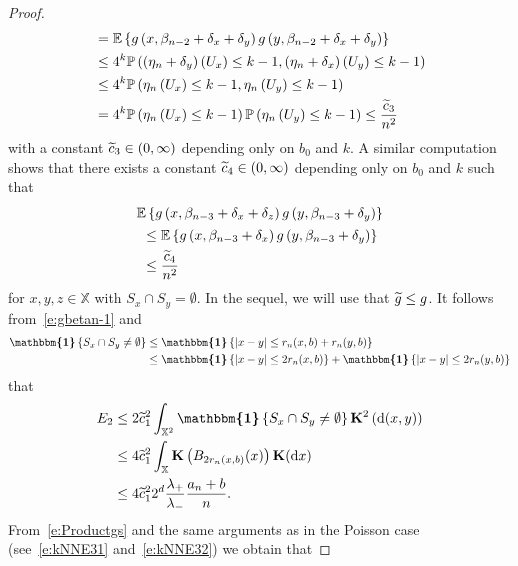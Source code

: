 \documentclass[AHL,Unicode,longabstracts]{cedram}
\newcommand*\bK{\mathbf{K}}
\renewcommand*\P{\mathbb{P}}
\newcommand*\X{\mathbb{X}}
\newcommand{\E}{\mathbb{E}}
\newcommand*\md{\mathrm{d}}
\newcommand{\mean}[1] {\E\left\{{#1}\right\}}
\newcommand{\ind}{\boldsymbol{\mathbbm{1}}}
\newcommand{\prob}[1]{\P\left(#1\right)}
\let\oldtilde\tilde
\renewcommand*{\tilde}[1]{\mathchoice{\widetilde{#1}}{\widetilde{#1}}{\oldtilde{#1}}{\oldtilde{#1}}}
\begin{document}
\begin{proof}
\begin{multline}
\begin{aligned}
&= \mean{g\left(x,\beta_{n-2}+\delta_x+\delta_y\right) g\left(y,\beta_{n-2}+\delta_x+\delta_y\right)} \\
& \leq 4^k \prob{\left(\eta_{n}+\delta_y\right)\left(U_{x}\right)\leq k-1, \left(\eta_{n}+\delta_x\right)\left(U_{y}\right)\leq k-1}\\
&\leq 4^k \prob{\eta_{n}\left(U_{x}\right)\leq k-1, \eta_{n}\left(U_{y}\right)\leq k-1} \\
& = 4^k \prob{\eta_{n}\left(U_{x}\right)\leq k-1} \prob{\eta_{n}\left(U_{y}\right)\leq k-1} \leq \frac{\tilde{c}_3}{n^2}
\end{aligned}
\end{multline}
with a constant $\tilde{c}_3\in(0,\infty)$ depending only on $b_0$ and $k$. A similar computation shows that there exists a constant $\tilde{c}_4\in(0,\infty)$ depending only on $b_0$ and $k$ such that
\begin{multline}\label{eqn:gSquareDisjointn-3}
\mean{g\left(x,\beta_{n-3}+\delta_x+\delta_z\right) g\left(y,\beta_{n-3}+\delta_y\right)}\\
\begin{aligned}
&\leq \mean{g\left(x,\beta_{n-3}+\delta_x\right) g\left(y,\beta_{n-3}+\delta_y\right)}
\\
&\leq \frac{\tilde{c}_4}{n^2}
\end{aligned}
\end{multline}
for $x,y,z\in \X$ with $S_x\cap S_y = \emptyset$. In the sequel, we will use that $\tilde{g}\leq g$. It follows from~\eqref{e:gbetan-1} and
\begin{align*}
\ind\left\{S_{x}\cap S_{y}\neq \emptyset\right\} & \leq \ind\left\{|x-y|\leq r_n(x,b)+r_n(y,b)\right\} \\
& \leq \ind\left\{|x-y|\leq 2r_n(x,b)\right\} + \ind\left\{|x-y|\leq 2r_n(y,b)\right\}
\end{align*}
that
\begin{equation}\label{e:E2b}
\begin{split}
E_2 & \leq 2 \tilde{c}_1^2 \int_{\X^2} \ind\left\{S_{x}\cap S_{y}\neq \emptyset\right\} \bK^2\left(\md (x,y)\right)\\
&\leq 4 \tilde{c}_1^2 \int_{\X} \bK\left(B_{2r_n(x,b)}(x)\right) \bK(\md x)\\
&\leq 4 \tilde{c}_1^2 2^d \frac{\lambda_+}{\lambda_-} \frac{a_n+b}{n}.
\end{split}
\end{equation}
From~\eqref{e:Productgs} and the same arguments as in the Poisson case (see~\eqref{e:kNNE31} and~\eqref{e:kNNE32}) we obtain that

\end{proof}
\end{document}
